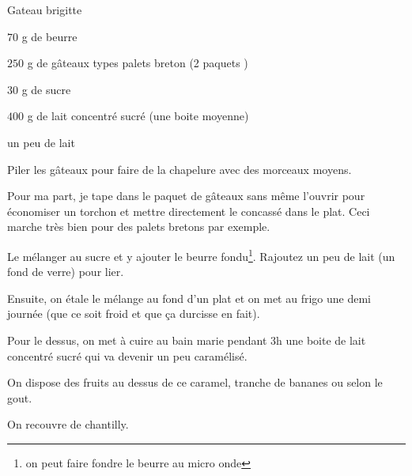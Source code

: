 \begin{recette}{Gateau brigitte}
\begin{ingredients}
\item $70$ g de beurre
\item $250$ g de gâteaux types palets breton (2 paquets )
\item $30$ g de sucre
\item $400$ g de lait concentré sucré (une boite moyenne)
\item un peu de lait
\end{ingredients}

\begin{preparation}
\etape Piler les gâteaux pour faire de la chapelure avec des morceaux moyens.

\begin{remarque}
Pour ma part, je tape dans le paquet de gâteaux sans même l'ouvrir pour économiser un torchon et mettre directement le concassé dans le plat. Ceci marche très bien pour des palets bretons par exemple.
\end{remarque}

\etape Le mélanger au sucre et y ajouter le beurre fondu\footnote{on peut faire fondre le beurre au micro onde}. Rajoutez un peu de lait (un fond de verre) pour lier.

\etape Ensuite, on étale le mélange au fond d'un plat et on met au frigo une demi journée (que ce soit froid et que ça durcisse en fait).

\etape Pour le dessus, on met à cuire au bain marie pendant 3h une boite de lait concentré sucré qui va devenir un peu caramélisé.

\etape On dispose des fruits au dessus de ce caramel, tranche de bananes ou selon le gout.

\etape On recouvre de chantilly.
\end{preparation}

\end{recette}

